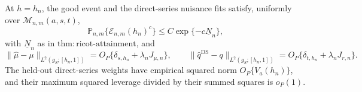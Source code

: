 At \(h=h_n\), the good event and the direct-series nuisance fits satisfy, uniformly over \(\mathcal M_{n,m}(a,s,t)\),
\[
\mathbb P_{n,m}\{\mathcal E_{n,m}(h_n)^c\}
\le C\exp\{-c\underline N_n\},
\]
with \(\underline N_n\) as in \(\mathrm{thm:ricot\text{-}attainment}\), and
\[
\|\widehat\mu-\mu\|_{L^2(g_S;[h_n,1])}=O_P\{\delta_{s,h_n}+\lambda_nJ_{\mu,n}\},
\qquad
\|\widehat q^{\mathrm{DS}}-q\|_{L^2(g_S;[h_n,1])}=O_P\{\delta_{t,h_n}+\lambda_nJ_{r,n}\}.
\]
The held-out direct-series weights have empirical squared norm \(O_P\{V_a(h_n)\}\), and their maximum squared leverage divided by their summed squares is \(o_P(1)\).